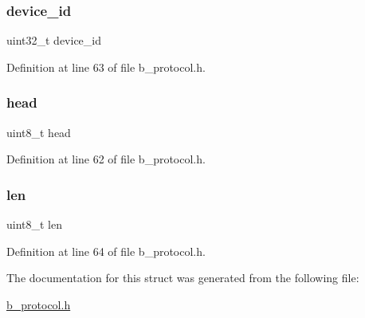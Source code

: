 \mbox{\label{structb_protocol_head__t_a658c495cd1900eadce3b800e3ebdac7a}} 
\subsubsection{\texorpdfstring{device\+\_\+id}{device\_id}}
{\footnotesize\ttfamily uint32\+\_\+t device\+\_\+id}



Definition at line 63 of file b\+\_\+protocol.\+h.

\mbox{\label{structb_protocol_head__t_a9794c0e61506b826b49b458708ae2489}} 
\subsubsection{\texorpdfstring{head}{head}}
{\footnotesize\ttfamily uint8\+\_\+t head}



Definition at line 62 of file b\+\_\+protocol.\+h.

\mbox{\label{structb_protocol_head__t_a5723e60ffd628510c699eddbce90be23}} 
\subsubsection{\texorpdfstring{len}{len}}
{\footnotesize\ttfamily uint8\+\_\+t len}



Definition at line 64 of file b\+\_\+protocol.\+h.



The documentation for this struct was generated from the following file\+:\begin{DoxyCompactItemize}
\item 
\mbox{\hyperlink{b__protocol_8h}{b\+\_\+protocol.\+h}}\end{DoxyCompactItemize}
